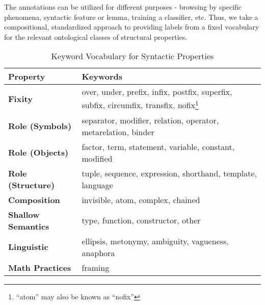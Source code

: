 The annotations can be utilized for different purposes - browsing by specific phenomena, syntactic feature or lemma, training a classifier, etc. Thus, we take a compositional, standardized approach to providing labels from a fixed vocabulary for the relevant ontological classes of structural properties.

\begin{table}
\begin{center}
\begin{tabular}{|l|l|} 
\hline \textbf{Property} & \textbf{Keywords} \\ \hline
\textbf{Fixity} & over, under, prefix, infix, postfix, superfix, subfix, circumfix, transfix, nofix\footnote{``atom'' may also be known as ``nofix''} \\[1mm]
\textbf{Role (Symbols)} & separator, modifier, relation,  operator, metarelation, binder \\[1mm]
\textbf{Role (Objects)} & factor, term, statement, variable, constant, modified \\[1mm]
\textbf{Role (Structure)} & tuple, sequence, expression, shorthand, template, language \\[1mm]
\textbf{Composition} & invisible, atom, complex, chained\\[1mm]
\textbf{Shallow Semantics} & type, function, constructor, other \\[1mm]
\textbf{Linguistic} & ellipsis, metonymy, ambiguity, vagueness, anaphora\\[1mm]
\textbf{Math Practices} & framing\\[1mm]
\hline
\end{tabular}
\caption{Keyword Vocabulary for Syntactic Properties}
\end{center}
\end{table}

